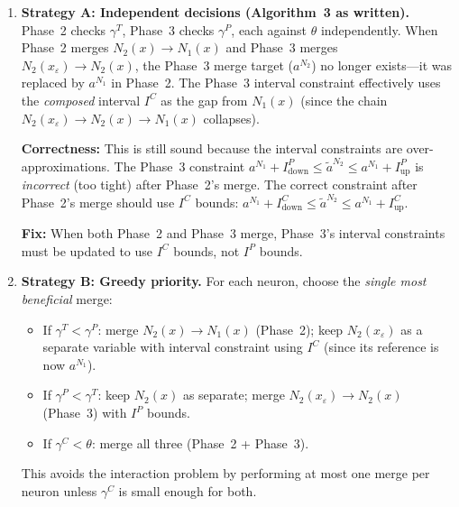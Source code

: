 \documentclass[11pt]{article}
\begin{document}
\begin{enumerate}
\item \textbf{Strategy A: Independent decisions (Algorithm~3 as written).}
Phase~2 checks $\gamma^T$, Phase~3 checks $\gamma^P$, each against
$\theta$ independently. When Phase~2 merges $N_2(x) \to N_1(x)$ and
Phase~3 merges $N_2(x_\varepsilon) \to N_2(x)$, the Phase~3 merge
target ($a^{N_2}$) no longer exists---it was replaced by $a^{N_1}$ in
Phase~2. The Phase~3 interval constraint effectively uses the
\emph{composed} interval $I^C$ as the gap from $N_1(x)$
(since the chain $N_2(x_\varepsilon) \to N_2(x) \to N_1(x)$ collapses).

\textbf{Correctness:} This is still sound because the interval constraints
are over-approximations. The Phase~3 constraint
$a^{N_1} + I^P_\text{down} \le \tilde{a}^{N_2} \le a^{N_1} + I^P_\text{up}$
is \emph{incorrect} (too tight) after Phase~2's merge.
The correct constraint after Phase~2's merge should use $I^C$ bounds:
$a^{N_1} + I^C_\text{down} \le \tilde{a}^{N_2} \le a^{N_1} + I^C_\text{up}$.

\textbf{Fix:} When both Phase~2 and Phase~3 merge, Phase~3's interval
constraints must be updated to use $I^C$ bounds, not $I^P$ bounds.

\item \textbf{Strategy B: Greedy priority.}
For each neuron, choose the \emph{single most beneficial} merge:
\begin{itemize}
    \item If $\gamma^T < \gamma^P$: merge $N_2(x) \to N_1(x)$ (Phase~2);
          keep $N_2(x_\varepsilon)$ as a separate variable with interval
          constraint using $I^C$ (since its reference is now $a^{N_1}$).
    \item If $\gamma^P < \gamma^T$: keep $N_2(x)$ as separate; merge
          $N_2(x_\varepsilon) \to N_2(x)$ (Phase~3) with $I^P$ bounds.
    \item If $\gamma^C < \theta$: merge all three (Phase~2 + Phase~3).
\end{itemize}
This avoids the interaction problem by performing at most one merge
per neuron unless $\gamma^C$ is small enough for both.


\end{enumerate}
\end{document}
